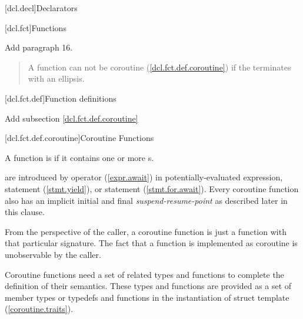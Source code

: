 
[dcl.decl]{Declarators}

\setcounter{section}{3}
\setcounter{subsection}{4}
[dcl.fct]{Functions}%

Add paragraph 16.

\begin{quote}
\setcounter{Paras}{15}
\pnum
A function can not be coroutine (\ref{dcl.fct.def.coroutine}) if the  terminates with an ellipsis.
\end{quote}

\setcounter{section}{3}
[dcl.fct.def]{Function definitions}

Add subsection \ref{dcl.fct.def.coroutine}

\setcounter{subsection}{3}
[dcl.fct.def.coroutine]{Coroutine Functions}


\pnum
A function is  if it contains
one or more s. 

\pnum
{} are introduced by  operator (\ref{expr.await}) in potentially-evaluated expression,
 statement (\ref{stmt.yield}), 
or  statement (\ref{stmt.for.await}). Every coroutine function
also has an implicit initial and final \textit{suspend-resume-point} as described later in this clause. 

\pnum
\enternote
From the perspective of the caller, a coroutine function is just a function with that particular signature. The fact that a function is implemented as coroutine is unobservable by the caller. 
\exitnote

\pnum
Coroutine functions need a set of related types and functions
to complete the definition of their semantics.
These types and functions are provided as a set of member types or typedefs
and functions in the instantiation of struct template
 (\ref{coroutine.traits}). 

